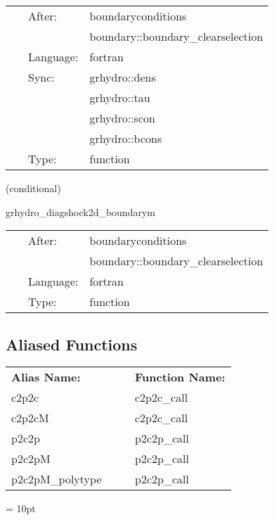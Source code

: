 \hspace{5mm}

 \begin{tabular*}{160mm}{cll} 
~ & After:  & boundaryconditions \\ 
~& ~ &boundary::boundary\_clearselection\\ 
~ & Language:  & fortran \\ 
~ & Sync:  & grhydro::dens \\ 
~& ~ &grhydro::tau\\ 
~& ~ &grhydro::scon\\ 
~& ~ &grhydro::bcons\\ 
~ & Type:  & function \\ 
\end{tabular*} 


\vspace{5mm}

   (conditional) 

\hspace{5mm} grhydro\_diagshock2d\_boundarym 

\hspace{5mm}{\it 2-d diagonal shock boundary conditions } 


\hspace{5mm}

 \begin{tabular*}{160mm}{cll} 
~ & After:  & boundaryconditions \\ 
~& ~ &boundary::boundary\_clearselection\\ 
~ & Language:  & fortran \\ 
~ & Type:  & function \\ 
\end{tabular*} 


\subsection*{Aliased Functions}

\hspace{5mm}

 \begin{tabular*}{160mm}{ll} 

{\bf Alias Name:} ~~~~~~~ & {\bf Function Name:} \\ 
c2p2c & c2p2c\_call \\ 
c2p2cM & c2p2c\_call \\ 
p2c2p & p2c2p\_call \\ 
p2c2pM & p2c2p\_call \\ 
p2c2pM\_polytype & p2c2p\_call \\ 
\end{tabular*} 



\vspace{5mm}\parskip = 10pt 
